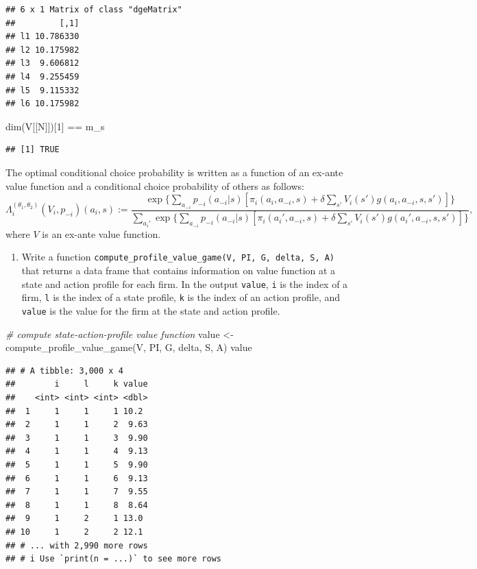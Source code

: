 \documentclass[
]{book}
\newenvironment{Shaded}{\begin{snugshade}}{\end{snugshade}}
\newcommand{\CommentTok}[1]{\textcolor[rgb]{0.56,0.35,0.01}{\textit{#1}}}
\newcommand{\DecValTok}[1]{\textcolor[rgb]{0.00,0.00,0.81}{#1}}
\newcommand{\FunctionTok}[1]{\textcolor[rgb]{0.00,0.00,0.00}{#1}}
\newcommand{\NormalTok}[1]{#1}
\newcommand{\OtherTok}[1]{\textcolor[rgb]{0.56,0.35,0.01}{#1}}
\newcommand{\SpecialCharTok}[1]{\textcolor[rgb]{0.00,0.00,0.00}{#1}}
\providecommand{\tightlist}{%
  \setlength{\itemsep}{0pt}\setlength{\parskip}{0pt}}
\begin{document}
\begin{verbatim}
## 6 x 1 Matrix of class "dgeMatrix"
##         [,1]
## l1 10.786330
## l2 10.175982
## l3  9.606812
## l4  9.255459
## l5  9.115332
## l6 10.175982
\end{verbatim}

\begin{Shaded}
\begin{Highlighting}[]
\FunctionTok{dim}\NormalTok{(V[[N]])[}\DecValTok{1}\NormalTok{] }\SpecialCharTok{==}\NormalTok{ m\_s}
\end{Highlighting}
\end{Shaded}

\begin{verbatim}
## [1] TRUE
\end{verbatim}

The optimal conditional choice probability is written as a function of an ex-ante value function and a conditional choice probability of others as follows:
\[
\Lambda_i^{(\theta_1, \theta_2)}(V_i, p_{-i})(a_i, s) := \frac{\exp\{\sum_{a_{-i}}p_{-i}(a_{-i}|s)[\pi_i(a_i, a_{-i}, s) + \delta \sum_{s'}V_i(s')g(a_i, a_{-i}, s, s')]\}}{\sum_{a_i'}\exp\{\sum_{a_{-i}}p_{-i}(a_{-i}|s)[\pi_i(a_i', a_{-i}, s) + \delta \sum_{s'}V_i(s')g(a_i', a_{-i}, s, s')]\}},
\]
where \(V\) is an ex-ante value function.

\begin{enumerate}
\def\labelenumi{\arabic{enumi}.}
\setcounter{enumi}{7}
\tightlist
\item
  Write a function \texttt{compute\_profile\_value\_game(V,\ PI,\ G,\ delta,\ S,\ A)} that returns a data frame that contains information on value function at a state and action profile for each firm. In the output \texttt{value}, \texttt{i} is the index of a firm, \texttt{l} is the index of a state profile, \texttt{k} is the index of an action profile, and \texttt{value} is the value for the firm at the state and action profile.
\end{enumerate}

\begin{Shaded}
\begin{Highlighting}[]
\CommentTok{\# compute state{-}action{-}profile value function}
\NormalTok{value }\OtherTok{\textless{}{-}} \FunctionTok{compute\_profile\_value\_game}\NormalTok{(V, PI, G, delta, S, A)}
\NormalTok{value}
\end{Highlighting}
\end{Shaded}

\begin{verbatim}
## # A tibble: 3,000 x 4
##        i     l     k value
##    <int> <int> <int> <dbl>
##  1     1     1     1 10.2 
##  2     1     1     2  9.63
##  3     1     1     3  9.90
##  4     1     1     4  9.13
##  5     1     1     5  9.90
##  6     1     1     6  9.13
##  7     1     1     7  9.55
##  8     1     1     8  8.64
##  9     1     2     1 13.0 
## 10     1     2     2 12.1 
## # ... with 2,990 more rows
## # i Use `print(n = ...)` to see more rows
\end{verbatim}
\end{document}
